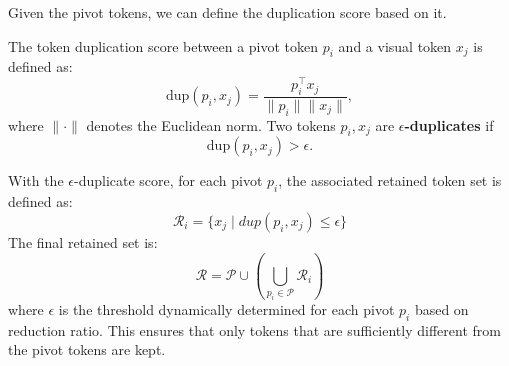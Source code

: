 Given the pivot tokens, we can define the duplication score based on it.
\begin{definition}\label{def:dup}
The token duplication score between a pivot token $ p_i $ and a visual token $ x_j $ is defined as: %
\begin{equation}
    \text{dup}(p_i, x_j) = \frac{p_i^\top x_j}{\| p_i \|  \| x_j \|},
\end{equation}
where $ \| \cdot \| $ denotes the Euclidean norm. Two tokens $ p_i, x_j $ are \textbf{$ \epsilon $-duplicates} if
\begin{equation}
    \text{dup}(p_i, x_j)  > \epsilon.
\end{equation}
\end{definition}
With the $\epsilon$-duplicate score, for each pivot \( p_i \), the associated retained token set is defined as:
\begin{equation}
    \mathcal{R}_i = \{ x_j \mid dup(p_i, x_j) \leq \epsilon \}
\end{equation}
The final retained set is:
\begin{equation}
    \mathcal{R} = \mathcal{P} \cup \left( \bigcup_{p_i \in \mathcal{P}} \mathcal{R}_i \right)
\end{equation}
where \( \epsilon \) is the threshold dynamically determined for each pivot \( p_i \) based on reduction ratio.
This ensures that only tokens that are sufficiently different from the pivot tokens are kept.


